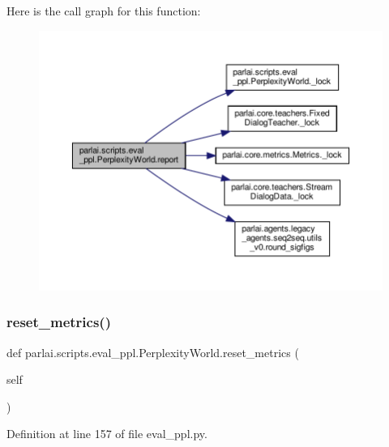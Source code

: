Here is the call graph for this function\+:
\nopagebreak
\begin{figure}[H]
\begin{center}
\leavevmode
\includegraphics[width=350pt]{classparlai_1_1scripts_1_1eval__ppl_1_1PerplexityWorld_ae3b38df8869d22000b5bb570de883c1f_cgraph}
\end{center}
\end{figure}
\mbox{\label{classparlai_1_1scripts_1_1eval__ppl_1_1PerplexityWorld_a568271c275fbe3f911c1e437a04655cf}} 
\subsubsection{\texorpdfstring{reset\+\_\+metrics()}{reset\_metrics()}}
{\footnotesize\ttfamily def parlai.\+scripts.\+eval\+\_\+ppl.\+Perplexity\+World.\+reset\+\_\+metrics (\begin{DoxyParamCaption}\item[{}]{self }\end{DoxyParamCaption})}



Definition at line 157 of file eval\+\_\+ppl.\+py.



